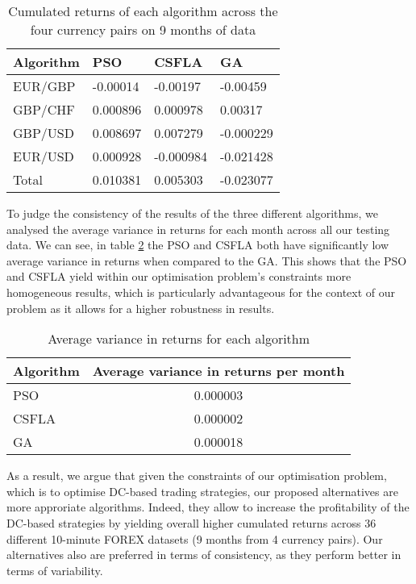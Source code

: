 \documentclass[conference]{IEEEtran}
\begin{document}
\begin{table}[htbp]
\caption{Cumulated returns of each algorithm across the four currency pairs on 9 months of data}\label{returns_table}
\centering
\begin{tabular}{|l|l|l|l|}
\hline
\multicolumn{1}{|c|}{Algorithm} & PSO      & CSFLA     & GA        \\ \hline
EUR/GBP                         & -0.00014 & -0.00197  & -0.00459  \\
GBP/CHF                         & 0.000896 & 0.000978  & 0.00317   \\
GBP/USD                         & 0.008697 & 0.007279  & -0.000229 \\
EUR/USD                         & 0.000928 & -0.000984 & -0.021428 \\ \hline
Total                           & 0.010381 & 0.005303  & -0.023077 \\ \hline
\end{tabular}
\end{table}

To judge the consistency of the results of the three different algorithms, we analysed the average variance in returns for each month across all our testing data. We can see, in table \ref{variance_table} the PSO and CSFLA both have significantly low average variance in returns when compared to the GA. This shows that the PSO and CSFLA yield within our optimisation problem's constraints more homogeneous results, which is particularly advantageous for the context of our problem as it allows for a higher robustness in results.

\begin{table}[htbp]
\caption{Average variance in returns for each algorithm}\label{variance_table}
\centering
\begin{tabular}{|l|c|}
\hline
Algorithm & Average variance in returns per month \\ \hline
PSO       & 0.000003                            \\ \hline
CSFLA     & 0.000002                            \\ \hline
GA        & 0.000018                            \\ \hline
\end{tabular}
\end{table}

As a result, we argue that given the constraints of our optimisation problem, which is to optimise DC-based trading strategies, our proposed alternatives are more approriate algorithms. Indeed, they allow to increase the profitability of the DC-based strategies by yielding overall higher cumulated returns across 36 different 10-minute FOREX datasets (9 months from 4 currency pairs). Our alternatives also are preferred in terms of consistency, as they perform better in terms of variability. 
\end{document}
